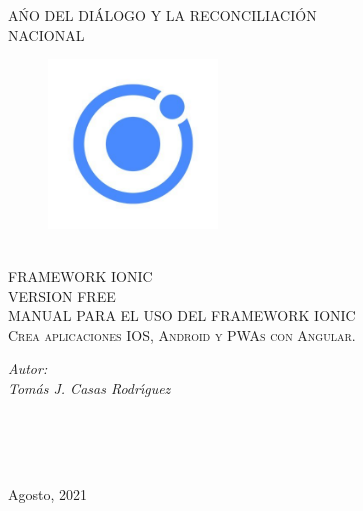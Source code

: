 \AddToShipoutPicture{\BackgroundPic}
\frontmatter 
\pagestyle{plain} 
\begin{titlepage}
\begin{center}
\textsc{\Large A\'NO DEL DI\'ALOGO Y LA RECONCILIACI\'ON}\\[0.5cm] 
\textsc{\Large NACIONAL}\\[0.5cm] 
\begin{figure}[h]
\centering
\includegraphics[width=0.4\textwidth]{logo.jpg}
\end{figure}

\textsc{\huge }\\[0.3cm]
\textsc{\Large FRAMEWORK IONIC}\\[0.2cm]
\textsc{\Large VERSION FREE}\\[1.5cm] 
\textsc{\Large MANUAL PARA EL USO DEL FRAMEWORK IONIC }\\[0.5cm] 
\textsc{\Large  Crea aplicaciones IOS, Android y PWAs con Angular.}\\[3.0cm] 
\bigskip
\begin{minipage}{0.4\textwidth}
\begin{flushleft} \large
\bigskip
\bigskip
\emph{Autor: }\\
\emph{Tom\'as J. Casas Rodr\'\i{}guez}\\

\end{flushleft}
\end{minipage}
\begin{minipage}{0.4\textwidth}
\begin{flushright} \large
\bigskip
\bigskip
\emph{} \\
\emph{} \\

\end{flushright}
\end{minipage}\\[2cm]
{\large Agosto, 2021}\\[2cm] 
\vfill
\end{center}
\end{titlepage}